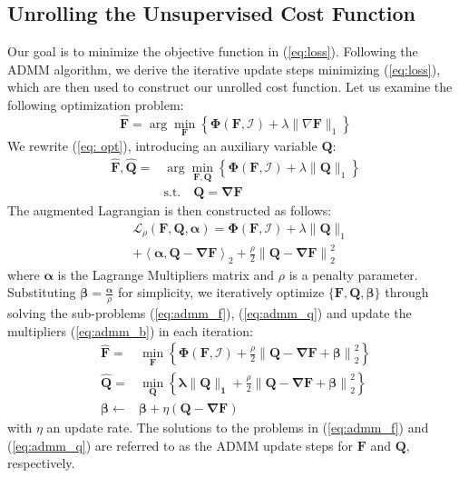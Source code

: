 \documentclass[10pt,twocolumn,letterpaper]{article}
\begin{document}
\subsection{Unrolling the Unsupervised Cost Function}
Our goal is to minimize the objective function in (\ref{eq:loss}). Following the ADMM \cite{admm0} algorithm, we derive the iterative update steps minimizing (\ref{eq:loss}), which are then used to construct our unrolled cost function.
Let us examine the following optimization problem:
\begin{equation} \label{eq: opt}
    \hat{\mathbf{F}}=\arg\min_\mathbf{F} \left\{ \mathbf{\Phi}\left( \mathbf{F},\mathcal{I} \right)+\lambda\|\nabla \mathbf{F} \|_1 \right\}
\end{equation}
We rewrite (\ref{eq: opt}), introducing an auxiliary variable $\mathbf{Q}$:
\begin{equation}
\begin{aligned}
    \mathbf{\hat{F},\hat{Q}}=&\arg\min_{\mathbf{F,Q}} \left\{ \mathbf{\Phi}\left( \mathbf{F},\mathcal{I} \right)+\lambda\|\mathbf{Q}\|_1 \right\} \\ &\text{s.t.} \quad \mathbf{Q=\nabla F}
\end{aligned}
\end{equation}
The augmented Lagrangian is then constructed as follows:
\begin{equation}
\begin{aligned}
     &\mathcal{L}_{\rho}(\mathbf{F,Q},\boldsymbol{\alpha}) = \mathbf{\Phi}\left( \mathbf{F},\mathcal{I} \right)+\lambda\|\mathbf{Q}\|_1\\ 
     &+ \mathbf{\left<\boldsymbol{\alpha},Q - \nabla F \right>}_2 + \frac{\rho}{2} \mathbf{\|Q - \nabla F\|}_2^2
\end{aligned}
\end{equation}
where $\boldsymbol{\alpha}$ is the Lagrange Multipliers matrix and $\rho$ is a penalty parameter. Substituting $\boldsymbol{\beta}=\frac{\boldsymbol{\alpha}}{\rho}$ for simplicity, we iteratively optimize $\mathbf{\{F,Q,\boldsymbol{\beta}\}}$ through solving the sub-problems (\ref{eq:admm_f}), (\ref{eq:admm_q}) and update the multipliers (\ref{eq:admm_b}) in each iteration:
\begin{subequations} 
\begin{align}
    \hat{\mathbf{F}}=&\min_{\mathbf{F}} \left\{\mathbf{\Phi}\left( \mathbf{F},\mathcal{I} \right) + \frac{\rho}{2} \mathbf{\|Q - \nabla F + \boldsymbol{\beta}\|}_2^2 \right\} \label{eq:admm_f} \\ 
    \hat{\mathbf{Q}}=&\min_{\mathbf{Q}} \left\{\mathbf{\lambda\|Q\|_1} + \frac{\rho}{2} \mathbf{\|Q - \nabla F + \boldsymbol{\beta}\|}_2^2 \right\} \label{eq:admm_q} \\ 
    \boldsymbol{\beta} \leftarrow &\boldsymbol{\beta} + \eta \mathbf{\left( Q - \nabla F \right)} \label{eq:admm_b}
\end{align}
\end{subequations}
with $\eta$ an update rate. The solutions to the problems in (\ref{eq:admm_f}) and (\ref{eq:admm_q}) are referred to as the ADMM update steps for $\mathbf{F}$ and $\mathbf{Q}$, respectively.
\end{document}
